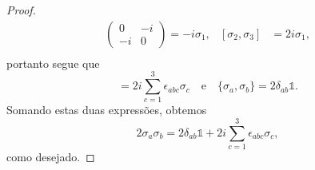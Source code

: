 \begin{proof}
\begin{align*}
\begin{pmatrix}
            0&-i\\-i&0
        \end{pmatrix} = -i \sigma_1,&
            [\sigma_2, \sigma_3] &= 2i \sigma_1,\\
    \end{align*}
    portanto segue que
    \begin{equation*}
        [\sigma_a, \sigma_b] = 2i \sum_{c=1}^3 \epsilon_{abc}\sigma_c\quad\text{e}\quad\{\sigma_a, \sigma_b\} = 2 \delta_{ab} \mathds{1}.
    \end{equation*}
    Somando estas duas expressões, obtemos
    \begin{equation*}
        2\sigma_a \sigma_b = 2 \delta_{ab} \mathds{1} + 2i\sum_{c = 1}^3 \epsilon_{abc}\sigma_c,
    \end{equation*}
    como desejado.
\end{proof}

